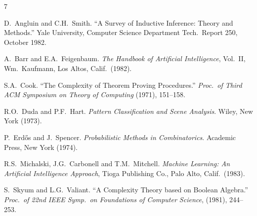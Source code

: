 \begin{thebibliography}{7}

D.~Angluin and C.H.~Smith.
``A Survey of Inductive Inference: Theory and Methods.''
Yale University, Computer Science Department
Tech.\ Report 250, October 1982.

A.~Barr and E.A.~Feigenbaum.
\emph{The Handbook of Artificial Intelligence}, Vol.~II, Wm.~Kaufmann,
Los Altos, Calif.\ (1982).

S.A.~Cook.
``The Complexity of Theorem Proving Procedures.''
\emph{Proc.\ of Third ACM Symposium on Theory of Computing} (1971), 151--158.

R.O.~Duda and P.F.~Hart.
\emph{Pattern Classification and Scene Analysis}.
Wiley, New York (1973).

P.~Erd\H{o}s and J.~Spencer.
\emph{Probabilistic Methods in Combinatorics}.
Academic Press, New York (1974).

R.S.~Michalski, J.G.~Carbonell and T.M.~Mitchell.
\emph{Machine Learning: An Artificial Intelligence Approach},
Tioga Publishing Co., Palo Alto, Calif.\ (1983).

S.~Skyum and L.G.~Valiant.
``A Complexity Theory based on Boolean Algebra.''
\emph{Proc.\ of 22nd IEEE Symp.\ on Foundations of Computer Science}, (1981), 244--253.

\end{thebibliography}
